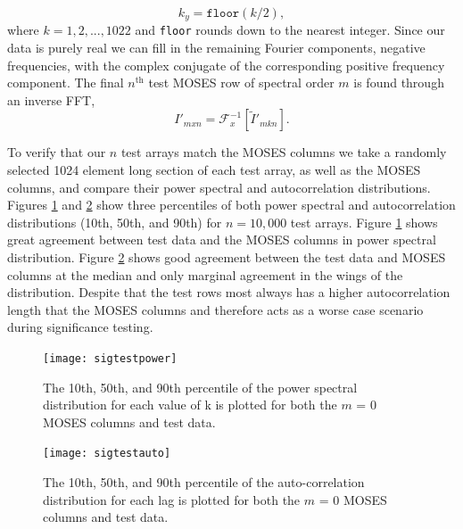 		\begin{equation}
			k_y = \texttt{floor}(k/2),
		\end{equation}
		where $k = 1, 2,...,1022$ and \texttt{floor} rounds down to the nearest integer.
		Since our data is purely real we can fill in the remaining Fourier components,  negative frequencies, with the complex conjugate of the corresponding positive frequency component.  
		The final $n^\text{th}$ test MOSES row of spectral order $m$ is found through an inverse FFT, 		
		\begin{equation}
			I'_{mxn} = \mathcal{F}_x^{-1}\left[\widetilde{I}'_{mkn}\right].
		\end{equation}
		
		To verify that our $n$ test arrays match the MOSES columns we take a randomly selected 1024 element long section of each test array, as well as the MOSES columns, and compare their power spectral and autocorrelation distributions. 
		Figures \ref{fig:sigtestpower} and \ref{fig:sigtestauto}  show three percentiles of both power spectral and autocorrelation distributions (10th, 50th, and 90th) for $n=10,000$ test arrays. 
		Figure \ref{fig:sigtestpower} shows great agreement between test data and the MOSES columns in power spectral distribution.  
		Figure \ref{fig:sigtestauto} shows good agreement between the test data and MOSES columns at the median and only marginal agreement in the wings of the distribution.  
		Despite that the test rows most always has a higher autocorrelation length that the MOSES columns and therefore acts as a worse case scenario during significance testing.  
					
		\begin{figure}
			\centering
			\texttt{[image: sigtestpower]}
			\caption{The 10th, 50th, and 90th percentile of the power spectral distribution for each value of k is plotted for both the $m$ = 0 MOSES columns and test data.}
			\label{fig:sigtestpower}
		\end{figure}
		\begin{figure}
			\centering
			\texttt{[image: sigtestauto]}
			\caption{The 10th, 50th, and 90th percentile of the auto-correlation distribution for each lag is plotted for both the $m$ = 0 MOSES columns and test data.}
			\label{fig:sigtestauto}
		\end{figure}
	
